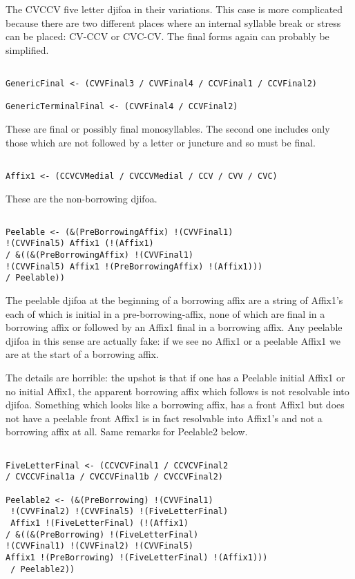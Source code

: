 \documentclass[12pt]{article}
\begin{document}
The CVCCV five letter djifoa in their variations.  This case is more complicated because there are two different
places where an internal syllable break or stress can be placed:  CV-CCV or CVC-CV.  The final forms again
can probably be simplified.

\begin{verbatim}

GenericFinal <- (CVVFinal3 / CVVFinal4 / CCVFinal1 / CCVFinal2)

GenericTerminalFinal <- (CVVFinal4 / CCVFinal2)

\end{verbatim}

These are final or possibly final monosyllables.  The second one includes only those which are not followed by a letter or juncture and so must be final.

\begin{verbatim}

Affix1 <- (CCVCVMedial / CVCCVMedial / CCV / CVV / CVC)

\end{verbatim}

These are the non-borrowing djifoa.

\begin{verbatim}

Peelable <- (&(PreBorrowingAffix) !(CVVFinal1) 
!(CVVFinal5) Affix1 (!(Affix1) 
/ &((&(PreBorrowingAffix) !(CVVFinal1) 
!(CVVFinal5) Affix1 !(PreBorrowingAffix) !(Affix1))) 
/ Peelable))

\end{verbatim}

The peelable djifoa at the beginning of a borrowing affix are a string of Affix1's each of which is initial in a pre-borrowing-affix, none of which are final in a borrowing affix or followed by an Affix1 final in a borrowing affix.  Any peelable djifoa in this sense are actually fake:  if we see no Affix1 or a peelable Affix1 we are at the start of a borrowing affix.

The details are horrible:  the upshot is that if one has a Peelable initial Affix1 or no initial Affix1, the apparent borrowing affix which follows is not resolvable into djifoa.  Something which looks like a borrowing affix, has a front Affix1 but does not have a peelable front Affix1 is in fact resolvable into Affix1's and not a borrowing affix at all.  Same remarks for Peelable2 below.

\begin{verbatim}

FiveLetterFinal <- (CCVCVFinal1 / CCVCVFinal2 
/ CVCCVFinal1a / CVCCVFinal1b / CVCCVFinal2)

Peelable2 <- (&(PreBorrowing) !(CVVFinal1)
 !(CVVFinal2) !(CVVFinal5) !(FiveLetterFinal)
 Affix1 !(FiveLetterFinal) (!(Affix1) 
/ &((&(PreBorrowing) !(FiveLetterFinal) 
!(CVVFinal1) !(CVVFinal2) !(CVVFinal5) 
Affix1 !(PreBorrowing) !(FiveLetterFinal) !(Affix1)))
 / Peelable2))

\end{verbatim}
\end{document}
